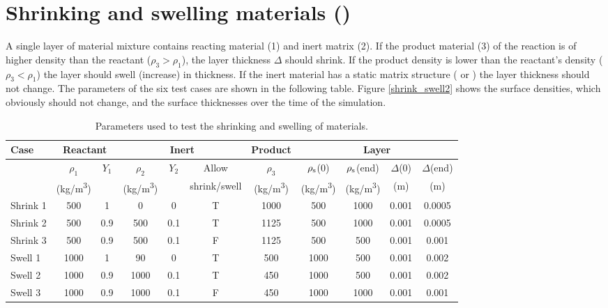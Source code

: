 \documentclass[11pt]{book}
\begin{document}
\clearpage

\section{Shrinking and swelling materials (\texorpdfstring{}{shrink\_swell})}

A single layer of material mixture contains reacting material (1) and inert matrix (2).
If the product material (3) of the reaction is of higher density than the
reactant ($\rho_3 > \rho_1$), the layer thickness $\Delta$ should shrink.
If the product density is lower than the reactant's density ($\rho_3 < \rho_1$) the layer should swell (increase) in thickness. If the inert material has
a static matrix structure ( or ) the layer thickness should not change. The parameters of the
six test cases are shown in the following table. Figure \ref{shrink_swell2} shows the surface densities, which obviously should not change, and the surface
thicknesses over the time of the simulation.

\begin{table}[ht]
\begin{center}
\caption[Parameters for shrinking and swelling of materials]{Parameters used to test the shrinking and swelling of materials.}
\label{shrink_swell}
\begin{tabular}{|l|c|c|c|c|c|c|c|c|c|c|}
\hline
Case     & \multicolumn{2}{|c|}{Reactant}  &  \multicolumn{3}{|c|}{Inert} & Product & \multicolumn{4}{|c|}{Layer} \\ \hline
         & $\rho_1$  & $Y_1$ & $\rho_2$  & $Y_2$ & Allow        & $\rho_3$  & $\rho_{\rm s}$(0) & $\rho_{\rm s}$(end) & $\Delta$(0) & $\Delta$(end) \\
         & (\si{kg/m^3})&       & (\si{kg/m^3})&       & shrink/swell & (\si{kg/m^3})& (\si{kg/m^3})  & (\si{kg/m^3})    & (m)         & (m) \\ \hline

Shrink 1 & 500 & 1   & 0   & 0   & T   & 1000   & 500 & 1000   & 0.001  & 0.0005 \\
Shrink 2 & 500 &0.9  &500  &0.1  &T &1125 &500  &1000 &0.001   &0.0005 \\
Shrink 3 & 500 &0.9  &500  &0.1  &F &1125 &500  &500  &0.001   &0.001 \\
Swell 1          & 1000 &1 &90   &0 &T &500  &1000 &500  &0.001   &0.002 \\
Swell 2          & 1000 &0.9  &1000 &0.1  &T &450  &1000 &500  &0.001   &0.002 \\
Swell 3          & 1000 &0.9  &1000 &0.1  &F &450  &1000 &1000 &0.001   &0.001 \\ \hline
\end{tabular}
\end{center}
\end{table}
\end{document}
